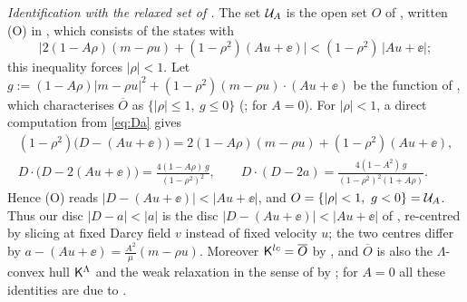 \emph{Identification with the relaxed set of \cite{Men22}.} The set $\mathcal{U}_A$ is the open set $O$ of \cite{Men22}, written (O) in \cite{LM26}, which consists of the states with
\[
\big|2(1-A\rho)(m-\rho u)+(1-\rho^2)(Au+\ee)\big|<(1-\rho^2)\,|Au+\ee| ;
\]
this inequality forces $|\rho|<1$. Let $g:=(1-A\rho)|m-\rho u|^2+(1-\rho^2)(m-\rho u)\cdot(Au+\ee)$ be the function of \cite[(A.1)]{LM26}, which characterises $\overline O$ as
$\{|\rho|\le1,\ g\le0\}$ (\cite[Lemmas~4.1--4.2]{Men22}; \cite[Prop.~2.3]{Sze12} for $A=0$). For $|\rho|<1$, a direct computation from \eqref{eq:Da} gives
\begin{equation}\label{x:UA-O}
\begin{gathered}
(1-\rho^2)\big(D-(Au+\ee)\big)=2(1-A\rho)(m-\rho u)+(1-\rho^2)(Au+\ee),\\
D\cdot\big(D-2(Au+\ee)\big)=\frac{4(1-A\rho)\,g}{(1-\rho^2)^2},\qquad D\cdot(D-2a)=\frac{4(1-A^2)\,g}{(1-\rho^2)^2(1+A\rho)} .
\end{gathered}
\end{equation}
Hence (O) reads $|D-(Au+\ee)|<|Au+\ee|$, and $O=\{|\rho|<1,\ g<0\}=\mathcal{U}_A$. Thus our disc $|D-a|<|a|$ is the
disc $|D-(Au+\ee)|<|Au+\ee|$ of \cite{Men22,LM26}, re-centred by slicing at fixed Darcy field $v$ instead of fixed velocity $u$; the two centres differ by
$a-(Au+\ee)=\frac{A^2}{\mu}(m-\rho u)$. Moreover $\mathsf{K}^{lc}=\overline O$ by \cite{Men22}, and $\overline O$ is also the $\Lambda$-convex hull $\mathsf{K}^\Lambda$ and the weak relaxation in the
sense of \cite[Sec.~2.1]{LM26} by \cite[Thm.~2.4]{LM26}; for $A=0$ all these identities are due to \cite{Sze12}.

